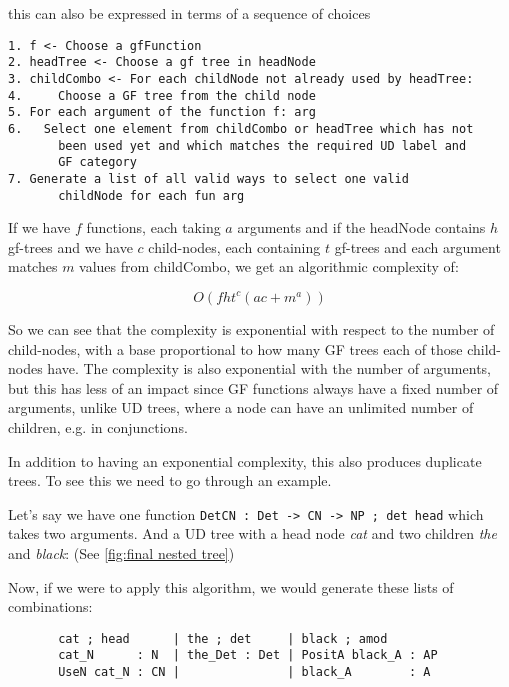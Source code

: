 this can also be expressed in terms of a sequence of choices

\begin{verbatim}
1. f <- Choose a gfFunction
2. headTree <- Choose a gf tree in headNode
3. childCombo <- For each childNode not already used by headTree:
4.     Choose a GF tree from the child node
5. For each argument of the function f: arg
6.   Select one element from childCombo or headTree which has not
       been used yet and which matches the required UD label and
       GF category
7. Generate a list of all valid ways to select one valid
       childNode for each fun arg
\end{verbatim}

If we have $f$ functions, each taking $a$ arguments and
if the headNode contains $h$ gf-trees
and we have $c$ child-nodes, each containing $t$ gf-trees
and each argument matches $m$ values from childCombo, we get an algorithmic complexity of:


$$
O(f h t^c (ac+m^a))
$$

So we can see that the complexity is exponential with respect to the number of child-nodes, with a base proportional to how many GF trees each of those child-nodes have. The complexity is also exponential with the number of arguments, but this has less of an impact since GF functions always have a fixed number of arguments, unlike UD trees, where a node can have an unlimited number of children, e.g. in conjunctions.


In addition to having an exponential complexity, this also produces duplicate trees. To see this we need to go through an example.

Let's say we have one function \verb|DetCN : Det -> CN -> NP ; det head| which takes two arguments.
And a UD tree with a head node \emph{cat} and two children \emph{the} and \emph{black}: (See \autoref{fig:final nested tree})

Now, if we were to apply this algorithm, we would generate these lists of combinations:
\begin{verbatim}
       cat ; head      | the ; det     | black ; amod
       cat_N      : N  | the_Det : Det | PositA black_A : AP
       UseN cat_N : CN |               | black_A        : A
\end{verbatim}

